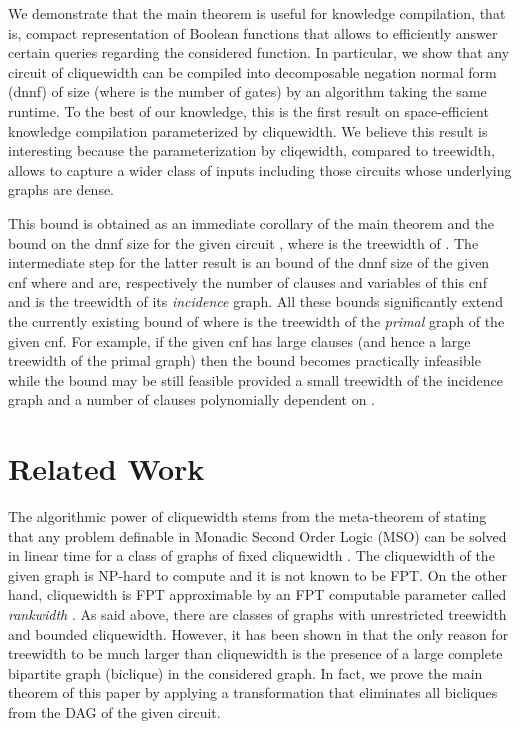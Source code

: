 \documentclass{llncs}
\begin{document}
We demonstrate that the main theorem is useful for knowledge compilation, that is, compact representation of Boolean
functions that allows to efficiently answer certain queries regarding the considered function.
In particular, we show 
that any circuit  of cliquewidth  can be compiled into decomposable negation normal form
({\sc dnnf}) \cite{DarwicheJACM} of size  (where  is the number of gates)
by an algorithm taking the same runtime. To the best of our knowledge, this is the first result 
on space-efficient knowledge compilation parameterized by cliquewidth. We believe this
result is interesting because the parameterization by
cliqewidth, compared to treewidth, allows to capture a wider class of inputs including those circuits
whose underlying graphs are dense. 

This bound is obtained as an immediate corollary of the main theorem
and the  bound on the {\sc dnnf} size for the given circuit , where  is the treewidth
of . The intermediate step for the latter result is an  bound of the {\sc dnnf} 
size of the given {\sc cnf} where  and  are, respectively the number of clauses and variables
of this {\sc cnf} and  is the treewidth of its \emph{incidence} graph. All these  bounds significantly 
extend the currently existing bound   of \cite{DarwicheJACM} where  is the treewidth of 
the \emph{primal} graph of the given {\sc cnf}. For example, if the given {\sc cnf} has large clauses (and hence
a large treewidth of the primal graph) then the  bound becomes practically
infeasible while the  bound may be still feasible provided a small treewidth of the incidence
graph and a number of clauses polynomially dependent on .  
\section{Related Work}
The algorithmic power of cliquewidth stems from the meta-theorem of \cite{CoMaRo}
stating that any problem definable in Monadic Second Order Logic (MSO) can be solved in linear time for a class
of graphs of fixed cliquewidth . The cliquewidth of the given graph is NP-hard to compute \cite{CWNP}
and it is not known to be FPT. On the other hand, cliquewidth is FPT approximable by an FPT computable
parameter called \emph{rankwidth} \cite{CWDApprox,RWDCompute}. As said above, there are classes of graphs with unrestricted treewidth
and bounded cliquewidth. However, it has been shown in \cite{CWDNoBicliques} that the only reason for treewidth to be much larger
than cliquewidth is the presence of a large complete bipartite graph (biclique) in the considered graph. In fact, we prove the main theorem of this 
paper by applying a transformation that eliminates all bicliques from the DAG of the given circuit. 
\end{document}

